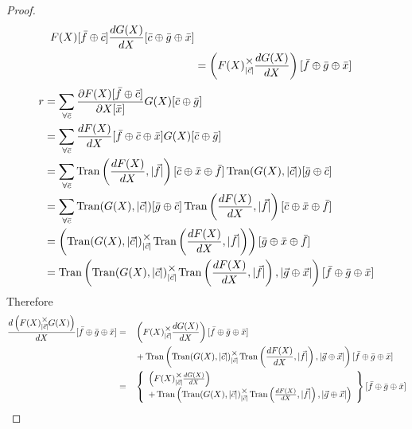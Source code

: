 \documentclass[12pt]{book}
\theoremstyle{plain}
\theoremstyle{definition}
\theoremstyle{ppart}
\theoremstyle{case}
\theoremstyle{solution}
\DeclareMathOperator{\Tran}{Tran}
\newcommand{\mmult}[1]{\text{\raisebox{1ex}{$\underset{#1}{\times}$}}}
\begin{document}
\begin{landscape}
\begin{proof}
\begin{align*}
    F(X)[\bar{f} \oplus \bar{c}]
    \frac{dG(X)}{dX}[\bar{c} \oplus \bar{g} \oplus \bar{x}] \\
 &=
   \left( F(X) \mmult{|\vec{c}|} \frac{dG(X)}{dX} \right)
   [\bar{f} \oplus \bar{g} \oplus \bar{x}]
\end{align*}
\begin{align*}
 r
 &=
  \sum_{\forall \bar{c}}
    \frac{\partial F(X)[\bar{f} \oplus \bar{c}]}{\partial X[\bar{x}]}
    G(X)[\bar{c} \oplus \bar{g}] \\
 &=
  \sum_{\forall \bar{c}}
    \frac{dF(X)}{dX}[\bar{f} \oplus \bar{c} \oplus \bar{x}]
    G(X)[\bar{c} \oplus \bar{g}] \\
 &=
  \sum_{\forall \bar{c}}
    \Tran\left(\frac{dF(X)}{dX}, |\vec{f}|\right)
      [\bar{c} \oplus \bar{x} \oplus \bar{f}]
    \Tran(G(X), |\vec{c}|)[\bar{g} \oplus \bar{c}] \\
 &=
  \sum_{\forall \bar{c}}
    \Tran(G(X), |\vec{c}|)[\bar{g} \oplus \bar{c}]
    \Tran\left(\frac{dF(X)}{dX}, |\vec{f}|\right)
      [\bar{c} \oplus \bar{x} \oplus \bar{f}] \\
 &=
  \left(
    \Tran(G(X), |\vec{c}|) \mmult{|\vec{c}|}
    \Tran\left(\frac{dF(X)}{dX}, |\vec{f}|\right)
  \right)[\bar{g} \oplus \bar{x} \oplus \bar{f}] \\
 &= 
  \Tran\left(
    \Tran(G(X), |\vec{c}|) \mmult{|\vec{c}|}
    \Tran\left(\frac{dF(X)}{dX}, |\vec{f}|\right)
    , |\vec{g} \oplus \vec{x}|
  \right)[\bar{f} \oplus \bar{g} \oplus \bar{x}]
\end{align*}
Therefore 
\begin{alignat*}{3}
 \frac{d\left(F(X) \mmult{|\vec{c}|} G(X)\right)}{dX}
  [\bar{f} \oplus \bar{g} \oplus \bar{x}]
  &=&&
  \left( F(X) \mmult{|\vec{c}|} \frac{dG(X)}{dX} \right)
  [\bar{f} \oplus \bar{g} \oplus \bar{x}] \\
  &&&+
  \Tran\left(
    \Tran(G(X), |\vec{c}|) \mmult{|\vec{c}|}
    \Tran\left(\frac{dF(X)}{dX}, |\vec{f}|\right)
    , |\vec{g} \oplus \vec{x}|
  \right)[\bar{f} \oplus \bar{g} \oplus \bar{x}] \\
  &=&&
  \left\{
    \begin{array}{l}
      \left( F(X) \mmult{|\vec{c}|} \frac{dG(X)}{dX} \right) \\
      +
      \Tran\left(
        \Tran(G(X), |\vec{c}|) \mmult{|\vec{c}|}
        \Tran\left(\frac{dF(X)}{dX}, |\vec{f}|\right)
        , |\vec{g} \oplus \vec{x}|
      \right)
    \end{array}
  \right\}
  [\bar{f} \oplus \bar{g} \oplus \bar{x}]
\end{alignat*}
\end{proof}
\end{landscape}
\end{document}
